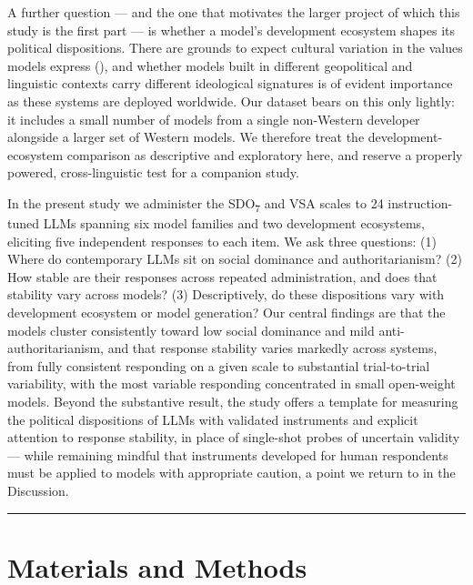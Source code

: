 \documentclass[
]{article}
\begin{document}
A further question --- and the one that motivates the larger project of
which this study is the first part --- is whether a model's development
ecosystem shapes its political dispositions. There are grounds to expect
cultural variation in the values models express
(), and whether models built
in different geopolitical and linguistic contexts carry different
ideological signatures is of evident importance as these systems are
deployed worldwide. Our dataset bears on this only lightly: it includes
a small number of models from a single non-Western developer alongside a
larger set of Western models. We therefore treat the
development-ecosystem comparison as descriptive and exploratory here,
and reserve a properly powered, cross-linguistic test for a companion
study.

In the present study we administer the SDO\textsubscript{7} and VSA
scales to 24 instruction-tuned LLMs spanning six model families and two
development ecosystems, eliciting five independent responses to each
item. We ask three questions: (1) Where do contemporary LLMs sit on
social dominance and authoritarianism? (2) How stable are their
responses across repeated administration, and does that stability vary
across models? (3) Descriptively, do these dispositions vary with
development ecosystem or model generation? Our central findings are that
the models cluster consistently toward low social dominance and mild
anti-authoritarianism, and that response stability varies markedly
across systems, from fully consistent responding on a given scale to
substantial trial-to-trial variability, with the most variable
responding concentrated in small open-weight models. Beyond the
substantive result, the study offers a template for measuring the
political dispositions of LLMs with validated instruments and explicit
attention to response stability, in place of single-shot probes of
uncertain validity --- while remaining mindful that instruments
developed for human respondents must be applied to models with
appropriate caution, a point we return to in the Discussion.

\begin{center}\rule{0.5\linewidth}{0.5pt}\end{center}

\section{Materials and Methods}\label{materials-and-methods}
\end{document}

